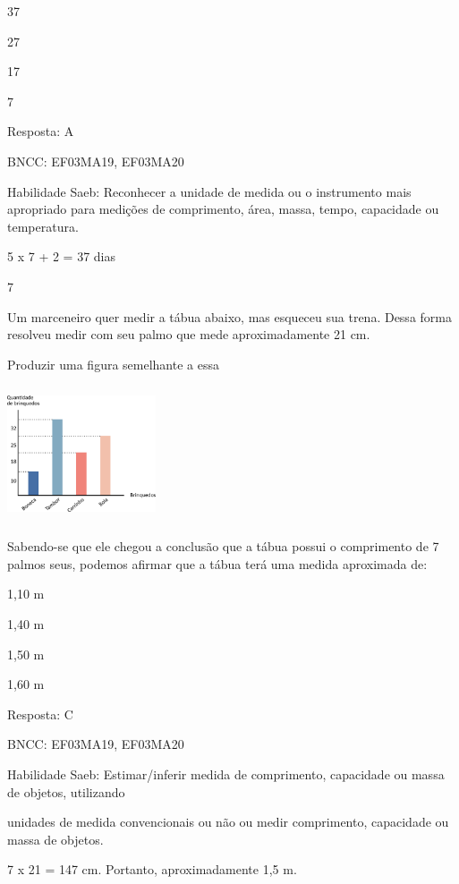 \begin{escolha}
\begin{escolha}
\item
  37
\item
  27
\item
  17
\item
  7
\end{escolha}

Resposta: A

BNCC: EF03MA19, EF03MA20

Habilidade Saeb: Reconhecer a unidade de medida ou o instrumento mais
apropriado para medições de comprimento, área, massa, tempo, capacidade
ou temperatura.

5 x 7 + 2 = 37 dias

\num{7}

Um marceneiro quer medir a tábua abaixo, mas esqueceu sua trena. Dessa
forma resolveu medir com seu palmo que mede aproximadamente 21 cm.

Produzir uma figura semelhante a essa

\includegraphics[width=1.73077in,height=1.57654in]{media/image119.png}

Sabendo-se que ele chegou a conclusão que a tábua possui o comprimento
de 7 palmos seus, podemos afirmar que a tábua terá uma medida aproximada
de:

\begin{escolha}
\item
  1,10 m
\item
  1,40 m
\item
  1,50 m
\item
  1,60 m
\end{escolha}

Resposta: C

BNCC: EF03MA19, EF03MA20

Habilidade Saeb: Estimar/inferir medida de comprimento, capacidade ou
massa de objetos, utilizando

unidades de medida convencionais ou não ou medir comprimento, capacidade
ou massa de objetos.

7 x 21 = 147 cm. Portanto, aproximadamente 1,5 m.


\end{escolha}
